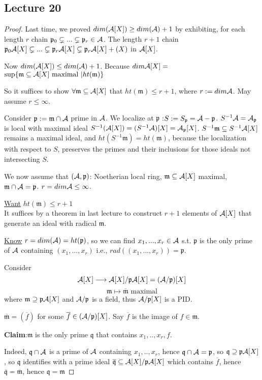 \documentclass[11pt]{article}
\newcommand{\scm}{{\mathfrak m}}
\newcommand{\scp}{{\mathfrak p}}
\newcommand{\scq}{\mathfrak q}
\newcommand{\cala}{{\cal A}}
\newcommand{\lrta}{\longrightarrow}
\begin{document}
\subsection{Lecture 20}
\begin{proof}
Last time, we proved $dim(\cala[X])\geq dim(\cala)+1$ by exhibiting, for each length $r$ chain $\scp_0\subsetneq ...\subsetneq \scp_r\in \cala$. The length $r+1$ chain $\scp_0\cala[X]\subsetneq ...\subsetneq \scp_r\cala[X]\subsetneq \scp_r\cala[X]+(X)$ in $\cala[X]$.

Now $dim(\cala[X])\leq dim(\cala)+1$. Because $dim \cala[X]=$ $\sup\{\scm\subseteq \cala[X] \text{ maximal }|ht(\scm)\}$

So it suffices to show $\forall\scm\subseteq \cala[X]$ that $ht(\scm)\leq r+1$, where $r:=dim\cala$. May assume $r\leq \infty$.

Consider $\scp:=\scm\cap\cala$ prime in $\cala$. We localize at $\scp$ :$S:=S_\scp=\cala-\scp$. $S^{-1}\cala=\cala_\scp$ is local with maximal ideal $S^{-1}(\cala[X])=(S^{-1}\cala)[X]=\cala_\scp[X]$. $S^{-1}\scm\subseteq S^{-1}\cala[X]$ remains a maximal ideal, and $ht(S^{-1}\scm)=ht(\scm)$, because the localization with respect to $S$, preserves the primes and their inclusions for those ideals not intersecting $S$.

We now assume that $(\cala,\scp)$: Noetherian local ring, $\scm\subseteq\cala[X]$ maximal, $\scm\cap\cala=\scp$. $r=dim\cala\leq \infty$.

\underline{Want} $ht(\scm)\leq r+1$\\
It suffices by a theorem in last lecture to construct $r+1$ elements of $\cala[X]$ that generate an ideal with radical $\scm$.

\underline{Know} $r=dim(\cala)=ht(\scp)$, so we can find $x_1,...,x_r\in\cala$ s.t.
$\scp$ is the only prime of $\cala$ containing $(x_1,...,x_r)$ i.e., $rad((x_1,...,x_r))=\scp.$

Consider
$$
\cala[X]\lrta\cala[X]/\scp\cala[X]=(\cala/\scp)[X]$$
$$
\scm\longmapsto\overline{\scm}\text{ maximal}
$$
where $\scm\supseteq\scp\cala[X]$ and $\cala/\scp$ is a field, thus $\cala/\scp[X]$ is a PID.

$\overline{\scm}=(\overline{f})$ for some $\overline{f}\in(\cala/\scp)[X]$. Say $\overline{f}$ is the image of $f\in\scm$.

\textbf{Claim}:$\scm$ is the only prime $\scq$ that contains $x_1,..,x_r,f.$

Indeed, $\scq\cap \cala$ is a prime of $\cala$ containing $x_1,..,x_r$, hence $\scq\cap \cala=\scp$, so $\scq\supseteq \scp\cala[X]$, so $\scq$ identifies with a prime ideal $\overline{\scq}\subseteq \cala[X]/\scp\cala[X]$ which contains $\overline{f}$, hence $\overline{\scq}=\overline{\scm}$, hence $\scq=\scm$

\end{proof}
\end{document}
